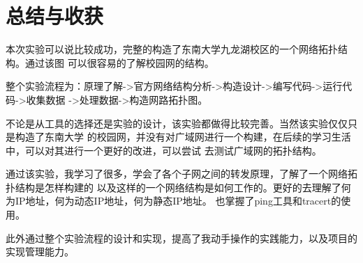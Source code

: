 \documentclass{article} %
\begin{document}
    \section{\LARGE 总结与收获}
    \par 本次实验可以说比较成功，完整的构造了东南大学九龙湖校区的一个网络拓扑结构。通过该图
    可以很容易的了解校园网的结构。
    \par 整个实验流程为：原理了解->官方网络结构分析->构造设计->编写代码->运行代码->收集数据
    ->处理数据->构造网路拓扑图。
    \par 不论是从工具的选择还是实验的设计，该实验都做得比较完善。当然该实验仅仅只是构造了东南大学
    的校园网，并没有对广域网进行一个构建，在后续的学习生活中，可以对其进行一个更好的改进，可以尝试
    去测试广域网的拓扑结构。
    \par 通过该实验，我学习了很多，学会了各个子网之间的转发原理，了解了一个网络拓扑结构是怎样构建的
    以及这样的一个网络结构是如何工作的。更好的去理解了何为IP地址，何为动态IP地址，何为静态IP地址。
    也掌握了ping工具和tracert的使用。
    \par 此外通过整个实验流程的设计和实现，提高了我动手操作的实践能力，以及项目的实现管理能力。
\end{document}
